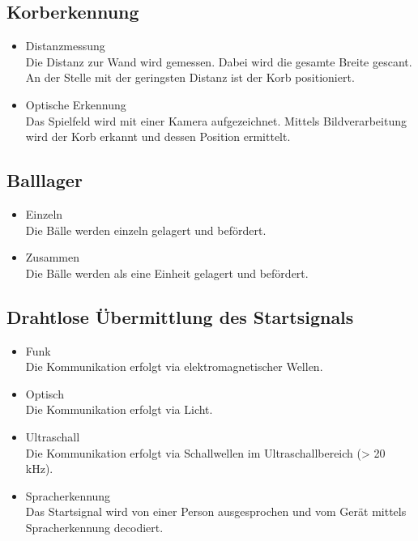 \subsection{Korberkennung}
\begin{itemize}
    \item Distanzmessung \\
        Die Distanz zur Wand wird gemessen. Dabei wird die gesamte Breite 
        gescant. An der Stelle mit der geringsten Distanz ist der Korb 
        positioniert. 
    \item Optische Erkennung \\
        Das Spielfeld wird mit einer Kamera aufgezeichnet. Mittels 
        Bildverarbeitung wird der Korb erkannt und dessen Position ermittelt. 
\end{itemize}

\subsection{Balllager}
\begin{itemize}
    \item Einzeln \\
        Die Bälle werden einzeln gelagert und befördert. 
    \item Zusammen \\
        Die Bälle werden als eine Einheit gelagert und befördert. 
\end{itemize}

\subsection{Drahtlose Übermittlung des Startsignals}
\begin{itemize}
    \item Funk \\
        Die Kommunikation erfolgt via elektromagnetischer Wellen. 
    \item Optisch \\
        Die Kommunikation erfolgt via Licht. 
    \item Ultraschall \\
        Die Kommunikation erfolgt via Schallwellen im Ultraschallbereich 
        (> 20 kHz). 
    \item Spracherkennung \\
        Das Startsignal wird von einer Person ausgesprochen und vom Gerät 
        mittels Spracherkennung decodiert. 
\end{itemize}

